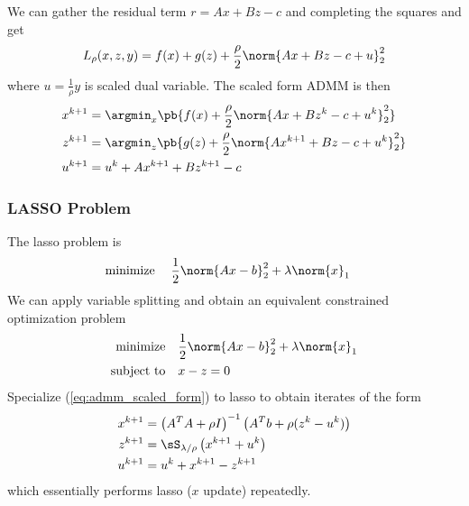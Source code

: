 \documentclass[../writeup.tex]{subfiles}
\begin{document}
We can gather the residual term $r=Ax+Bz-c$ and completing the squares and get
\begin{align}
    L_{\rho}(x,z,y)
        = f(x) + g(z) + \frac{\rho}{2} \norm{Ax + Bz - c + u}_2^2
    \label{eq:admm_scaled_augmented_lagrangian}
\end{align}
where $u=\frac{1}{\rho}y$ is scaled dual variable. The scaled form ADMM is then
\begin{align}
    x^{k+1}
        &= \argmin_x \pb{
            f(x) + \frac{\rho}{2} \norm{Ax+Bz^k-c+u^k}_2^2 
        } 
        \nonumber \\
    z^{k+1}
        &= \argmin_z \pb{
            g(z) + \frac{\rho}{2} \norm{Ax^{k+1}+Bz-c+u^k}_2^2
        } 
        \nonumber \\
    u^{k+1}
        &= u^k + Ax^{k+1} + Bz^{k+1} - c
    \label{eq:admm_scaled_form}
\end{align}

\subsubsection{LASSO Problem}

The lasso problem is 
\begin{align}
    \minimize\;
        & \frac{1}{2} \norm{Ax-b}_2^2 + \lambda \norm{x}_1
    \label{eq:lasso_unconstrained_problem}
\end{align}
We can apply variable splitting and obtain an equivalent constrained optimization problem
\begin{align}
    \minimize
        & \frac{1}{2} \norm{Ax-b}_2^2 + \lambda \norm{x}_1 \\
    \subjectto
        & x - z = 0
    \label{eq:lasso_unconstrained_problem}
\end{align}
Specialize (\ref{eq:admm_scaled_form}) to lasso to obtain iterates of the form
\begin{align}
    x^{k+1}
        &= \left( A^TA + \rho I \right)^{-1} \left( A^Tb + \rho(z^{k} - u^k) \right) \\
    z^{k+1}
        &= \sS_{\lambda/\rho} \left( x^{k+1} + u^k \right) \\
    u^{k+1}
        &= u^k + x^{k+1} - z^{k+1}
\end{align}
which essentially performs lasso ($x$ update) repeatedly.
\end{document}
